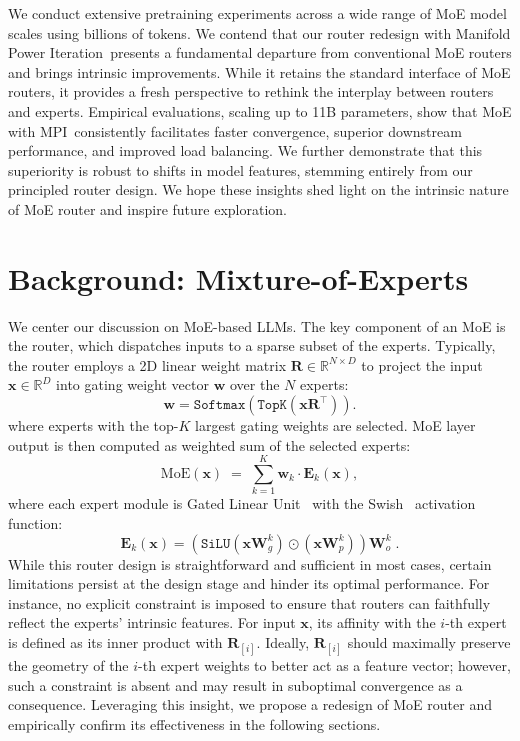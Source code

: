 \documentclass{llmxive}
\providecommand{\bm}[1]{\boldsymbol{#1}}
\providecommand{\name}{MPI}
\providecommand{\Name}{Manifold Power Iteration}
\providecommand{\vw}{{\bm{w}}}
\providecommand{\vx}{{\bm{x}}}
\providecommand{\mE}{{\bm{E}}}
\providecommand{\mR}{{\bm{R}}}
\providecommand{\mW}{{\bm{W}}}
\begin{document}
We conduct extensive pretraining experiments across a wide range of MoE model scales using billions of tokens.
We contend that our router redesign with \Name\ presents a fundamental departure from conventional MoE routers and brings intrinsic improvements.
While it retains the standard interface of MoE routers, it provides a fresh perspective to rethink the interplay between routers and experts.
Empirical evaluations, scaling up to 11B parameters, show that MoE with \name\ consistently facilitates faster convergence, superior downstream performance, and improved load balancing. 
We further demonstrate that this superiority is robust to shifts in model features, stemming entirely from our principled router design.
We hope these insights shed light on the intrinsic nature of MoE router and inspire future exploration. 









\section{Background: Mixture-of-Experts}
We center our discussion on MoE-based LLMs. 
The key component of an MoE is the router, which dispatches inputs to a sparse subset of the experts.
Typically, the router employs a 2D linear weight matrix \(\mR \in \mathbb{R}^{N\times D}\) to project the input \(\vx \in \mathbb{R}^D\) into gating weight vector \(\vw\) over the \(N\) experts:
\begin{equation}
    \vw = \texttt{Softmax}\left(\texttt{TopK}\left(\vx\mR^\top\right)\right).
\end{equation}
where experts with the top-$K$ largest gating weights are selected.
MoE layer output is then computed as weighted sum of the selected experts:
\begin{equation}
    \textrm{MoE}\left(\vx\right) \; = \; \sum_{k=1}^K{\vw_k \cdot \mE_k(\vx)}, 
\end{equation}
where each expert module is Gated Linear Unit~\cite{glu} with the Swish~\cite{swish} activation function:
\[
    \mE_k(\vx) = \left(\texttt{SiLU}(\vx\mW^{k}_{g}) \odot (\vx \mW^{k}_{p})\right)  \mW^{k}_{o} \;.
\]
While this router design is straightforward and sufficient in most cases, certain limitations persist at the design stage and  hinder its optimal performance.
For instance, no explicit constraint is imposed to ensure that routers can faithfully reflect the experts' intrinsic features.
For input $\vx$, its affinity with the $i$-th expert is defined as its inner product with $\mR_{[i]}$.
Ideally, $\mR_{[i]}$ should maximally preserve the geometry of the $i$-th expert weights to better act as a feature vector; however, such a constraint is absent and may result in suboptimal convergence as a consequence.
Leveraging this insight, we propose a redesign of MoE router and empirically confirm its effectiveness in the following sections.
\end{document}

